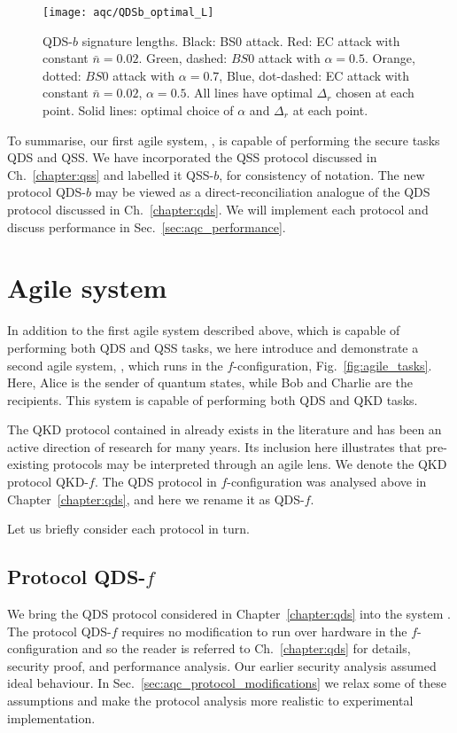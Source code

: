 \begin{figure}[htp]
\captionsetup{width=0.8\linewidth}
\centering
\texttt{[image: aqc/QDSb\_optimal\_L]}
\caption{\label{fig:aqc_qdsb_lengths} QDS-$b$ signature lengths. Black: BS$0$ attack. Red: EC attack with constant $\bar{n} = 0.02$. Green, dashed: $BS0$ attack with $\alpha=0.5$. Orange, dotted: $BS0$ attack with $\alpha=0.7$, Blue, dot-dashed: EC attack with constant $\bar{n}=0.02$, $\alpha=0.5$. All lines have optimal $\Delta_r$ chosen at each point. Solid lines: optimal choice of $\alpha$ and $\Delta_r$ at each point.}
\end{figure}

To summarise, our first agile system, \systemB, is capable of performing the secure tasks QDS and QSS. We have incorporated the QSS protocol discussed in Ch.~\ref{chapter:qss} and labelled it QSS-$b$, for consistency of notation. The new protocol QDS-$b$ may be viewed as a direct-reconciliation analogue of the QDS protocol discussed in Ch.~\ref{chapter:qds}. We will implement each protocol and discuss performance in Sec.~\ref{sec:aqc_performance}.

\section{Agile system \systemF}\label{sec:aqc_systemf}

In addition to the first agile system described above, which is capable of performing both QDS and QSS tasks, we here introduce and demonstrate a second agile system, \systemF, which runs in the $f$-configuration, Fig.~\ref{fig:agile_tasks}. Here, Alice is the sender of quantum states, while Bob and Charlie are the recipients. This system is capable of performing both QDS and QKD tasks.

The QKD protocol contained in \systemF \; already exists in the literature \cite{Leverrier2011, Papanastasiou2018} and has been an active direction of research for many years. Its inclusion here illustrates that pre-existing protocols may be interpreted through an agile lens. We denote the QKD protocol QKD-$f$. The QDS protocol in $f$-configuration was analysed above in Chapter~\ref{chapter:qds}, and here we rename it as QDS-$f$.

Let us briefly consider each protocol in turn.

\subsection{Protocol QDS-$f$}
We bring the QDS protocol considered in Chapter~\ref{chapter:qds} into the system \systemF. The protocol QDS-$f$ requires no modification to run over hardware in the $f$-configuration and so the reader is referred to Ch.~\ref{chapter:qds} for details, security proof, and performance analysis. Our earlier security analysis assumed ideal behaviour. In Sec.~\ref{sec:aqc_protocol_modifications} we relax some of these assumptions and make the protocol analysis more realistic to experimental implementation.


